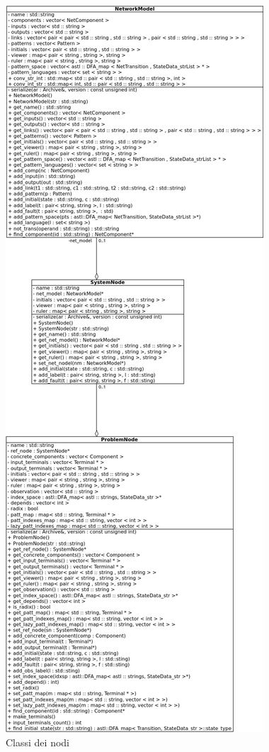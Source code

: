 \begin{figure}[htbp]
\centering
\includegraphics[scale=0.45]{./Img/implementazione/nodes.png}
\caption{Classi dei nodi}
\label{fig:nodes}
\end{figure}

